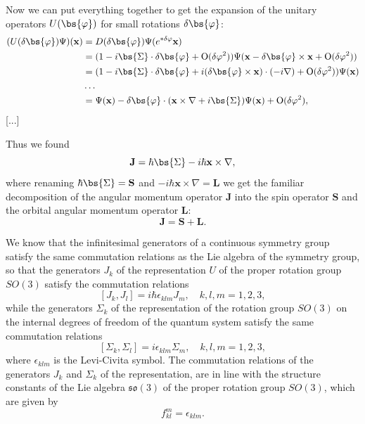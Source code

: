 \begin{example}
    Now we can put everything together to get the expansion of the unitary operators \(U(\bs{\varphi})\) for small rotations \(\delta \bs{\varphi}\):
    \[
        \begin{aligned}
            (U(\delta \bs{\varphi})\Psi)(\mathbf{x}) & = D(\delta \bs{\varphi})\Psi(e^{* \delta \varphi}\mathbf{x})                                                                                                          \\
                                                     & = (1 - i \bs{\Sigma} \cdot \delta \bs{\varphi} + \mathrm{O}(\delta \varphi^2))\Psi(\mathbf{x} - \delta \bs{\varphi} \times \mathbf{x} + \mathrm{O}(\delta \varphi^2)) \\
                                                     & = (1 - i \bs{\Sigma} \cdot \delta \bs{\varphi} + i (\delta \bs{\varphi} \times \mathbf{x}) \cdot (-i\nabla) + \mathrm{O}(\delta \varphi^2))\Psi(\mathbf{x})           \\
                                                     & \dots                                                                                                                                                                 \\
                                                     & = \Psi(\mathbf{x}) - \delta \bs{\varphi} \cdot (\mathbf{x} \times \nabla + i \bs{\Sigma})\Psi(\mathbf{x}) + \mathrm{O}(\delta \varphi^2),
        \end{aligned}
    \]
    [...]

    Thus we found
    \[
        \mathbf{J} = \hbar \bs{\Sigma} - i\hbar \mathbf{x} \times \nabla,
    \]
    where renaming \(\hbar \bs{\Sigma} = \mathbf{S}\) and \(-i \hbar \mathbf{x} \times \nabla = \mathbf{L}\) we get the familiar decomposition of the angular momentum operator \(\mathbf{J}\) into the spin operator \(\mathbf{S}\) and the orbital angular momentum operator \(\mathbf{L}\):
    \[
        \mathbf{J} = \mathbf{S} + \mathbf{L}.
    \]

    We know that the infinitesimal generators of a continuous symmetry group satisfy the same commutation relations as the Lie algebra of the symmetry group, so that the generators \(J_k\) of the representation \(U\) of the proper rotation group \(SO(3)\) satisfy the commutation relations
    \[
        [J_k, J_l] = i \hbar \epsilon_{klm} J_m, \quad k, l, m = 1, 2, 3,
    \]
    while the generators \(\Sigma_k\) of the representation of the rotation group \(SO(3)\) on the internal degrees of freedom of the quantum system satisfy the same commutation relations
    \[
        [\Sigma_k, \Sigma_l] = i \epsilon_{klm} \Sigma_m, \quad k, l, m = 1, 2, 3,
    \]
    where \(\epsilon_{klm}\) is the Levi-Civita symbol. The commutation relations of the generators \(J_k\) and \(\Sigma_k\) of the representation, are in line with the structure constants of the Lie algebra \(\mathfrak{so}(3)\) of the proper rotation group \(SO(3)\), which are given by
    \[
        f^m_{kl} = \epsilon_{klm}.
    \]


\end{example}
